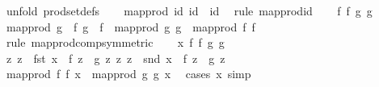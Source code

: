 \begin{isabellebody}
%
\isadelimproof
%
\endisadelimproof
%
\isatagproof
{}\isamarkupfalse%
\ {\isacharparenleft}{\kern0pt}unfold\ prod{\isacharunderscore}{\kern0pt}set{\isacharunderscore}{\kern0pt}defs{\isacharparenright}{\kern0pt}\isanewline
\ \ \isamarkupfalse%
\ {\isachardoublequoteopen}map{\isacharunderscore}{\kern0pt}prod\ id\ id\ {\isacharequal}{\kern0pt}\ id{\isachardoublequoteclose}\ \isamarkupfalse%
\ {\isacharparenleft}{\kern0pt}rule\ map{\isacharunderscore}{\kern0pt}prod{\isachardot}{\kern0pt}id{\isacharparenright}{\kern0pt}\isanewline
{}\isamarkupfalse%
\isanewline
\ \ \isamarkupfalse%
\ f{}\ f{}\ g{}\ g{}\isanewline
\ \ \isamarkupfalse%
\ {\isachardoublequoteopen}map{\isacharunderscore}{\kern0pt}prod\ {\isacharparenleft}{\kern0pt}g{}\ {\isasymcirc}\ f{}{\isacharparenright}{\kern0pt}\ {\isacharparenleft}{\kern0pt}g{}\ {\isasymcirc}\ f{}{\isacharparenright}{\kern0pt}\ {\isacharequal}{\kern0pt}\ map{\isacharunderscore}{\kern0pt}prod\ g{}\ g{}\ {\isasymcirc}\ map{\isacharunderscore}{\kern0pt}prod\ f{}\ f{}{\isachardoublequoteclose}\isanewline
\ \ \ \ \isamarkupfalse%
\ {\isacharparenleft}{\kern0pt}rule\ map{\isacharunderscore}{\kern0pt}prod{\isachardot}{\kern0pt}comp{\isacharbrackleft}{\kern0pt}symmetric{\isacharbrackright}{\kern0pt}{\isacharparenright}{\kern0pt}\isanewline
{}\isamarkupfalse%
\isanewline
\ \ \isamarkupfalse%
\ x\ f{}\ f{}\ g{}\ g{}\isanewline
\ \ \isamarkupfalse%
\ {\isachardoublequoteopen}{\isasymAnd}z{\isachardot}{\kern0pt}\ z\ {\isasymin}\ {\isacharbraceleft}{\kern0pt}fst\ x{\isacharbraceright}{\kern0pt}\ {\isasymLongrightarrow}\ f{}\ z\ {\isacharequal}{\kern0pt}\ g{}\ z{\isachardoublequoteclose}\ {\isachardoublequoteopen}{\isasymAnd}z{\isachardot}{\kern0pt}\ z\ {\isasymin}\ {\isacharbraceleft}{\kern0pt}snd\ x{\isacharbraceright}{\kern0pt}\ {\isasymLongrightarrow}\ f{}\ z\ {\isacharequal}{\kern0pt}\ g{}\ z{\isachardoublequoteclose}\isanewline
\ \ \isamarkupfalse%
\ {\isachardoublequoteopen}map{\isacharunderscore}{\kern0pt}prod\ f{}\ f{}\ x\ {\isacharequal}{\kern0pt}\ map{\isacharunderscore}{\kern0pt}prod\ g{}\ g{}\ x{\isachardoublequoteclose}\ \isamarkupfalse%
\ {\isacharparenleft}{\kern0pt}cases\ x{\isacharparenright}{\kern0pt}\ simp\isanewline

\end{isabellebody}
